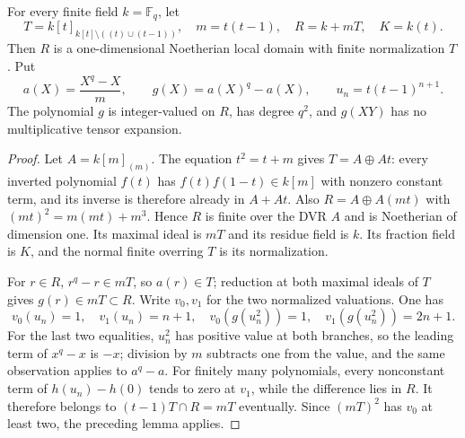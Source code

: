 \begin{example}\label{ex:all-finite-fields-two-branches}
For every finite field $k=\mathbb F_q$, let
\[
 T=k[t]_{k[t]\setminus((t)\cup(t-1))},\quad
 m=t(t-1),\quad R=k+mT,\quad K=k(t).
\]
Then $R$ is a one-dimensional Noetherian local domain with finite
normalization $T$. Put
\[
 a(X)=\frac{X^q-X}{m},\qquad g(X)=a(X)^q-a(X),\qquad
 u_n=t(t-1)^{n+1}.
\]
The polynomial $g$ is integer-valued on $R$, has degree $q^2$,
and $g(XY)$ has no multiplicative tensor expansion.
\end{example}
\begin{proof}
Let $A=k[m]_{(m)}$. The equation $t^2=t+m$ gives
$T=A\oplus At$: every inverted polynomial $f(t)$ has
$f(t)f(1-t)\in k[m]$ with nonzero constant term, and its
inverse is therefore already in $A+At$.
Also $R=A\oplus A(mt)$ with
$(mt)^2=m(mt)+m^3$. Hence $R$ is finite over the DVR $A$ and
is Noetherian of dimension one. Its maximal ideal is $mT$ and
its residue field is $k$. Its fraction field is $K$, and the
normal finite overring $T$ is its normalization.

For $r\in R$, $r^q-r\in mT$, so $a(r)\in T$; reduction at
both maximal ideals of $T$ gives $g(r)\in mT\subset R$.
Write $v_0,v_1$ for the two normalized valuations. One has
\[
 v_0(u_n)=1,\quad v_1(u_n)=n+1,\quad
 v_0(g(u_n^2))=1,\quad v_1(g(u_n^2))=2n+1.
\]
For the last two equalities, $u_n^2$ has positive value at both
branches, so the leading term of $x^q-x$ is $-x$; division by
$m$ subtracts one from the value, and the same observation applies
to $a^q-a$. For finitely many polynomials, every nonconstant term
of $h(u_n)-h(0)$ tends to zero at $v_1$, while the difference lies
in $R$. It therefore belongs to $(t-1)T\cap R=mT$ eventually.
Since $(mT)^2$ has $v_0$ at least two, the preceding lemma applies.
\end{proof}

